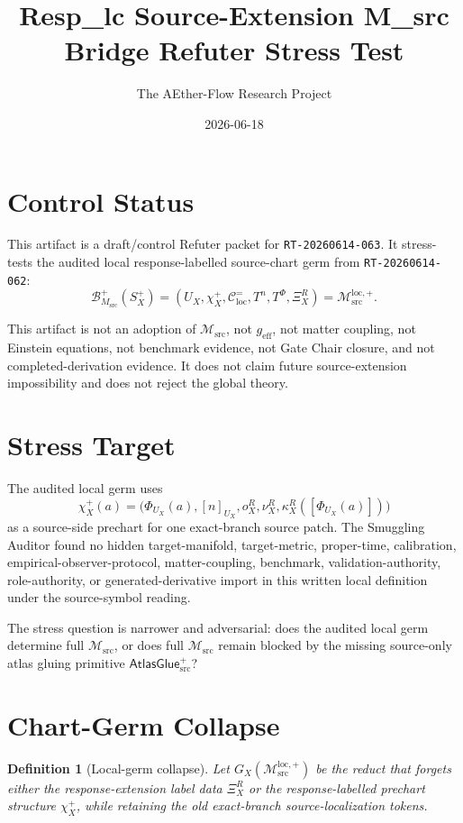 \documentclass[11pt]{article}
\title{Resp\_lc Source-Extension M\_src Bridge Refuter Stress Test}
\author{The AEther-Flow Research Project}
\date{2026-06-18}
\newcommand{\Msrc}{\mathcal{M}_{\mathrm{src}}}
\newcommand{\Mloc}{\mathcal{M}_{\mathrm{src}}^{\mathrm{loc},+}}
\newcommand{\geff}{g_{\mathrm{eff}}}
\newcommand{\XiR}{\Xi_X^R}
\newcommand{\Splus}{S_X^+}
\newcommand{\PhiU}{\Phi_{U_X}}
\newcommand{\Cexact}{\mathcal{C}^{=}_{\mathrm{loc}}}
\newcommand{\BMsrc}{\mathcal{B}^{+}_{M_{\mathrm{src}}}}
\newcommand{\AtlasGlue}{\mathsf{AtlasGlue}_{\mathrm{src}}^{+}}
\newtheorem{definition}{Definition}
\begin{document}
\maketitle

\section*{Control Status}

This artifact is a draft/control Refuter packet for
\texttt{RT-20260614-063}. It stress-tests the audited local
response-labelled source-chart germ from \texttt{RT-20260614-062}:
\[
  \BMsrc(\Splus)=
  (U_X,\chi_X^+,\Cexact,T^n,T^\Phi,\XiR)=\Mloc.
\]

This artifact is not an adoption of \(\Msrc\), not \(\geff\), not matter
coupling, not Einstein equations, not benchmark evidence, not Gate Chair
closure, and not completed-derivation evidence. It does not claim future
source-extension impossibility and does not reject the global theory.

\section{Stress Target}

The audited local germ uses
\[
  \chi_X^+(a)=
  \bigl(\PhiU(a),[n]_{U_X},o_X^R,\nu_X^R,
  \kappa_X^R([\PhiU(a)])\bigr)
\]
as a source-side prechart for one exact-branch source patch. The Smuggling
Auditor found no hidden target-manifold, target-metric, proper-time,
calibration, empirical-observer-protocol, matter-coupling, benchmark,
validation-authority, role-authority, or generated-derivative import in this
written local definition under the source-symbol reading.

The stress question is narrower and adversarial: does the audited local germ
determine full \(\Msrc\), or does full \(\Msrc\) remain blocked by the
missing source-only atlas gluing primitive \(\AtlasGlue\)?

\section{Chart-Germ Collapse}

\begin{definition}[Local-germ collapse]
Let \(G_X(\Mloc)\) be the reduct that forgets either the response-extension
label data \(\XiR\) or the response-labelled prechart structure
\(\chi_X^+\), while retaining the old exact-branch source-localization
tokens.
\end{definition}
\end{document}
